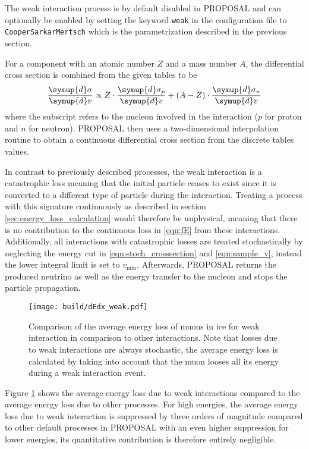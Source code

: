 \begin{sloppypar}
The weak interaction process is by default disabled in PROPOSAL and can optionally be enabled by setting the keyword \texttt{weak} in the configuration file to \texttt{CooperSarkarMertsch} which is the parametrization described in the previous section.
\end{sloppypar}
For a component with an atomic number $Z$ and a mass number $A$, the differential cross section is combined from the given tables to be
%
\begin{equation}
	\frac{\symup{d}\sigma}{\symup{d}v} \propto Z \cdot \frac{\symup{d}\sigma_p}{\symup{d}v} + (A - Z) \cdot \frac{\symup{d}\sigma_n}{\symup{d}v}
\end{equation}
%
where the subscript refers to the nucleon involved in the interaction ($p$ for proton and $n$ for neutron).
PROPOSAL then uses a two-dimensional interpolation routine to obtain a continuous differential cross section from the discrete tables values.

In contrast to previously described processes, the weak interaction is a catastrophic loss meaning that the initial particle ceases to exist since it is converted to a different type of particle during the interaction.
Treating a process with this signature continuously as described in section \ref{sec:energy_loss_calculation} would therefore be unphysical, meaning that there is no contribution to the continuous loss in \eqref{eqn:fE} from these interactions.
Additionally, all interactions with catastrophic losses are treated stochastically by neglecting the energy cut in \eqref{eqn:stoch_crosssection} and \eqref{eqn:sample_v}, instead the lower integral limit is set to $v_{\text{min}}$.
Afterwards, PROPOSAL returns the produced neutrino as well as the energy transfer to the nucleon and stops the particle propagation.

\begin{figure}
    \centering
    \texttt{[image: build/dEdx\_weak.pdf]}
    \caption{Comparison of the average energy loss of muons in ice for weak interaction in comparison to other interactions. Note that losses due to weak interactions are always stochastic, the average energy loss is calculated by taking into account that the muon looses all its energy during a weak interaction event.}
    \label{fig:dEdx_weak}
\end{figure}

Figure \ref{fig:dEdx_weak} shows the average energy loss due to weak interactions compared to the average energy loss due to other processes.
For high energies, the average energy loss due to weak interaction is suppressed by three orders of magnitude compared to other default processes in PROPOSAL with an even higher suppression for lower energies, its quantitative contribution is therefore entirely negligible.


